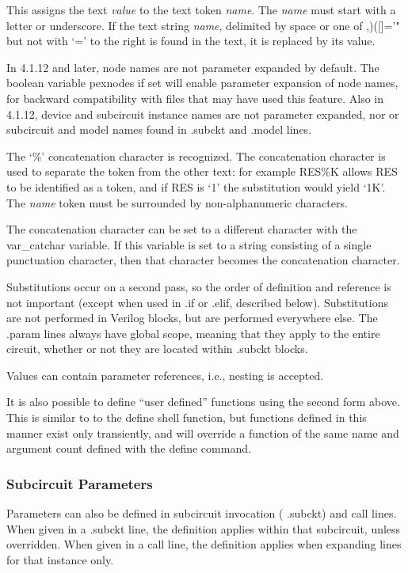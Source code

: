 This assigns the text {\it value} to the text token {\it name}.  The
{\it name} must start with a letter or underscore.  If the text string
{\it name}, delimited by space or one of {\vt ,)([]='"} but not with
`{\vt =}' to the right is found in the text, it is replaced by its
value. 

In 4.1.12 and later, node names are not parameter expanded by default. 
The boolean variable {\et pexnodes} if set will enable parameter
expansion of node names, for backward compatibility with files that
may have used this feature.  Also in 4.1.12, device and subcircuit
instance names are not parameter expanded, nor or subcircuit and model
names found in {\vt .subckt} and {\vt .model} lines.

The `{\vt \%}' concatenation character is recognized.  The
concatenation character is used to separate the token from the other
text:  for example {\vt RES\%K} allows {\vt RES} to be identified as a
token, and if {\vt RES} is `1' the substitution would yield `1K'.  The
{\it name} token must be surrounded by non-alphanumeric characters.

The concatenation character can be set to a different character with
the {\et var\_catchar} variable.  If this variable is set to a string
consisting of a single punctuation character, then that character
becomes the concatenation character.

Substitutions occur on a second pass, so the order of definition and
reference is not important (except when used in {\vt .if} or {\vt
.elif}, described below).  Substitutions are not performed in Verilog
blocks, but are performed everywhere else.  The {\vt .param} lines
always have global scope, meaning that they apply to the entire
circuit, whether or not they are located within {\vt .subckt} blocks.

Values can contain parameter references, i.e., nesting is accepted. 
       
It is also possible to define ``user defined'' functions using the
second form above.  This is similar to to the {\cb define} shell
function, but functions defined in this manner exist only transiently,
and will override a function of the same name and argument count
defined with the {\cb define} command. 

\subsubsection{Subcircuit Parameters}
 
Parameters can also be defined in subcircuit invocation ({\vt
.subckt}) and call lines.  When given in a {\vt .subckt} line, the
definition applies within that subcircuit, unless overridden.  When
given in a call line, the definition applies when expanding lines for
that instance only.

